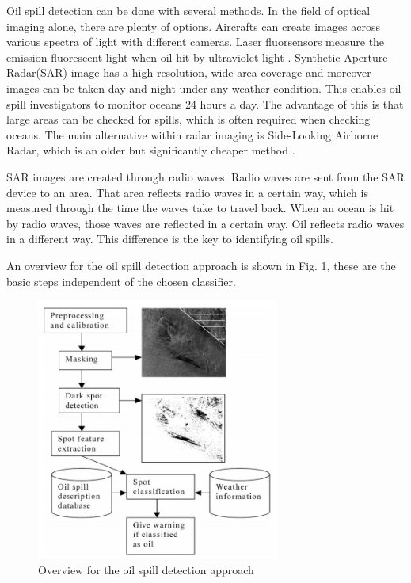 \hspace{0.5cm} Oil spill detection can be done with several methods. In the field of optical imaging alone, there are plenty of options. Aircrafts can create images across various spectra of light with different cameras. Laser fluorsensors measure the emission fluorescent light when oil hit by ultraviolet light \cite{fingas2014review}. Synthetic Aperture Radar(SAR) image has a high resolution, wide area coverage and moreover images can be taken day and night under any weather condition. This enables oil spill investigators to monitor oceans 24 hours a day\cite{Chang20081915}. The advantage of this is that large areas can be checked for spills, which is often required when checking oceans. The main alternative within radar imaging is Side-Looking Airborne Radar, which is an older but significantly cheaper method \cite{fingas2014review}. 

SAR images are created through radio waves. Radio waves are sent from the SAR device to an area. That area reflects radio waves in a certain way, which is measured through the time the waves take to travel back. \cite{Doerry:04} When an ocean is hit by radio waves, those waves are reflected in a certain way. Oil reflects radio waves in a different way. This difference is the key to identifying oil spills.

An overview for the oil spill detection approach is shown in Fig. 1, these are the basic steps independent of the chosen classifier.

\begin{figure}[H]
    \includegraphics[width=80mm]{./img/detection_diagram.png}
    \caption{Overview for the oil spill detection approach \cite{Solberg200745}}
    \label{fig:overview}
\end{figure}







